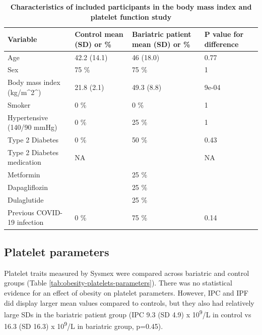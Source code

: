 \documentclass[11pt,twoside]{bristolthesis}
\begin{document}
\begin{table}

\caption[Characteristics of included participants in the body mass index and platelet function study]{\label{tab:obesity-platelets-participants}\textbf{Characteristics of included participants in the body mass index and platelet function study}}
\centering
\begin{tabu} to 
\toprule
Variable & Control mean (SD) or \% & Bariatric patient mean (SD) or \% & P value for difference\\
\midrule
Age & 42.2 (14.1) & 46 (18.0) & 0.77\\
Sex & 75 \% & 75 \% & 1\\
Body mass index (kg/m\textasciicircum{}2\textasciicircum{}) & 21.8 (2.1) & 49.3 (8.8) & 9e-04\\
Smoker & 0 \% & 0 \% & 1\\
Hypertensive (140/90 mmHg) & 0 \% & 25 \% & 1\\
\addlinespace
Type 2 Diabetes & 0 \% & 50 \% & 0.43\\
Type 2 Diabetes medication & NA &  & NA\\
\hspace{1em}Metformin &  & 25 \% & \\
\hspace{1em}Dapagliflozin &  & 25 \% & \\
\hspace{1em}Dulaglutide &  & 25 \% & \\
\addlinespace
Previous COVID-19 infection & 0 \% & 75 \% & 0.14\\
\bottomrule
\end{tabu}
\end{table}
\hypertarget{platelet-parameters}{%
\subsection{Platelet parameters}\label{platelet-parameters}}

Platelet traits measured by Sysmex were compared across bariatric and control groups (Table \ref{tab:obesity-platelets-parameters}). There was no statistical evidence for an effect of obesity on platelet parameters. However, IPC and IPF did display larger mean values compared to controls, but they also had relatively large SDs in the bariatric patient group (IPC 9.3 (SD 4.9) x 10\textsuperscript{9}/L in control vs 16.3 (SD 16.3) x 10\textsuperscript{9}/L in bariatric group, p=0.45).
\end{document}
